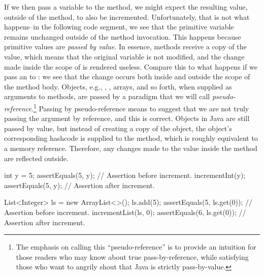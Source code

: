 If we then pass a variable to the  method, we might expect the resulting value, outside of the method, to also be incremented. Unfortunately, that is not what happens--in the following code segment, we see that the primitive variable  remains unchanged outside of the method invocation. This happens because primitive values are \textit{passed by value}. In essence, methods receive a copy of the value, which means that the original variable is not modified, and the change made inside the scope of  is rendered useless. Compare this to what happens if we pass an  to : we see that the change occurs both inside and outside the scope of the method body. Objects, e.g., , , arrays, and so forth, when supplied as arguments to methods, are passed by a paradigm that we will call \textit{pseudo-reference}.\footnote{The emphasis on calling this ``pseudo-reference'' is to provide an intuition for those readers who may know about true pass-by-reference, while satisfying those who want to angrily shout that Java is strictly pass-by-value.} Passing by pseudo-reference means to suggest that we are not truly passing the argument by reference, and this is correct. Objects in Java are still passed by value, but instead of creating a copy of the object, the object's corresponding hashcode is supplied to the method, which is roughly equivalent to a memory reference. Therefore, any changes made to the value inside the method are reflected outside.

\begin{verbnobox}[\small]
int y = 5;
assertEquals(5, y);         // Assertion before increment.
incrementInt(y);
assertEquals(5, y);         // Assertion after increment.
\end{verbnobox}

\begin{verbnobox}[\small]
List<Integer> ls = new ArrayList<>();
ls.add(5);
assertEquals(5, ls.get(0)); // Assertion before increment.
incrementList(ls, 0);
assertEquals(6, ls.get(0)); // Assertion after increment.
\end{verbnobox}


